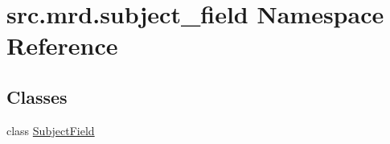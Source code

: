 \hypertarget{namespacesrc_1_1mrd_1_1subject__field}{\section{src.\+mrd.\+subject\+\_\+field Namespace Reference}
\label{namespacesrc_1_1mrd_1_1subject__field}
}
\subsection*{Classes}
\begin{DoxyCompactItemize}
\item 
class \hyperlink{classsrc_1_1mrd_1_1subject__field_1_1_subject_field}{Subject\+Field}
\end{DoxyCompactItemize}
